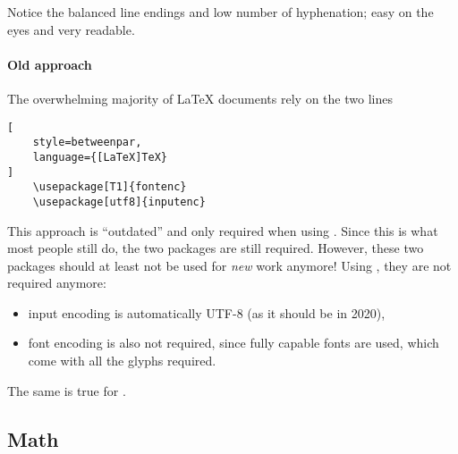Notice the balanced line endings and low number of hyphenation;
easy on the eyes and very readable.

\paragraph{Old approach}
The overwhelming majority of \LaTeX{} documents rely on the two lines
\begin{lstlisting}[
    style=betweenpar,
    language={[LaTeX]TeX}
]
    \usepackage[T1]{fontenc}
    \usepackage[utf8]{inputenc}
\end{lstlisting}
This approach is \enquote{outdated} and only required when using .
Since this is what most people still do, the two packages are still required.
However, these two packages should at least not be used for \emph{new} work anymore!
Using , they are not required anymore:
\begin{itemize}
    \item input encoding is automatically UTF-8 (as it should be in 2020),
    \item font encoding is also not required, since fully capable fonts are used,
        which come with all the glyphs required.
\end{itemize}
The same is true for .

\subsection{Math}


